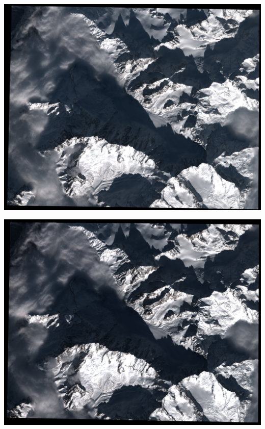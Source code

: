\documentclass[8pt]{beamer}
\begin{document}
\vspace*{-6.5mm}    
\begin{frame}[plain]
\hspace*{-11mm}
    \includegraphics[keepaspectratio,width=1.005\paperwidth,height=1.1\paperheight]{images/argentiere_left.png}
\end{frame} 

\vspace*{-6.5mm}    
\begin{frame}[plain]
\hspace*{-11mm}
    \includegraphics[keepaspectratio,width=1.005\paperwidth,height=1.1\paperheight]{images/argentiere_right.png}
\end{frame} 
\end{document}
